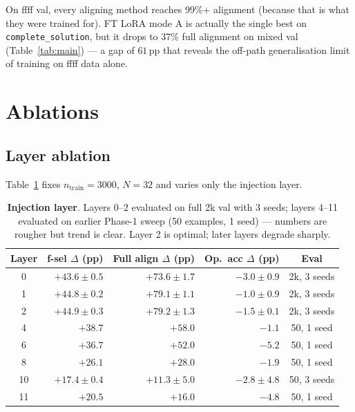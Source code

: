 \documentclass[10pt]{article}
\begin{document}
On ffff val, every aligning method reaches 99\%+ alignment (because that
is what they were trained for). FT LoRA mode A is actually the single
best on \texttt{complete\_solution}, but it drops to $37\%$ full
alignment on mixed val (Table~\ref{tab:main}) — a gap of $61$\,pp that
reveals the off-path generalisation limit of training on ffff data
alone.

\section{Ablations}

\subsection{Layer ablation}

Table~\ref{tab:layer} fixes $n_\text{train}{=}3000$, $N{=}32$ and varies
only the injection layer.

\begin{table}[ht]
  \centering\small
  \caption{\textbf{Injection layer}. Layers 0--2 evaluated on full 2k val
    with 3 seeds; layers 4--11 evaluated on earlier Phase-1 sweep (50
    examples, 1 seed) --- numbers are rougher but trend is clear. Layer 2
    is optimal; later layers degrade sharply.}
  \label{tab:layer}
  \renewcommand{\arraystretch}{1.1}
  \begin{tabular}{crrrc}
    \toprule
    \textbf{Layer} & \textbf{f-sel $\Delta$ (pp)} &
    \textbf{Full align $\Delta$ (pp)} & \textbf{Op.\ acc $\Delta$ (pp)} &
    \textbf{Eval} \\
    \midrule
    \rowcolor{rowhl} 0   & $+43.6 \pm 0.5$ & $+73.6 \pm 1.7$ & $-3.0 \pm 0.9$ & 2k, 3 seeds \\
    \rowcolor{rowhl} 1   & $+44.8 \pm 0.2$ & $+79.1 \pm 1.1$ & $\mathbf{-1.0 \pm 0.9}$ & 2k, 3 seeds \\
    \rowcolor{rowhl} 2   & $\mathbf{+44.9 \pm 0.3}$ & $\mathbf{+79.2 \pm 1.3}$ & $-1.5 \pm 0.1$ & 2k, 3 seeds \\
    4   & $+38.7$ & $+58.0$ & $-1.1$ & 50, 1 seed \\
    6   & $+36.7$ & $+52.0$ & $-5.2$ & 50, 1 seed \\
    8   & $+26.1$ & $+28.0$ & $-1.9$ & 50, 1 seed \\
    10  & $+17.4 \pm 0.4$ & $+11.3 \pm 5.0$ & $-2.8 \pm 4.8$ & 50, 3 seeds \\
    11  & $+20.5$ & $+16.0$ & $-4.8$ & 50, 1 seed \\
    \bottomrule
  \end{tabular}
\end{table}
\end{document}
